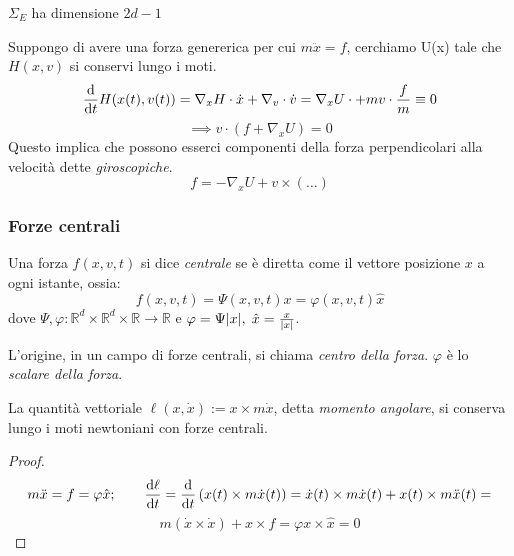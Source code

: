 \begin{remark}
    $\Sigma_E $ ha dimensione $2d-1$
\end{remark}

Suppongo di avere una forza genererica per cui $m\ddot{x}= f $, cerchiamo U(x) tale che $H(x,v)$ si conservi lungo i moti.
\begin{equation*}
    \dv{}{t}H(x(t),v(t))= \nabla_xH\cdot\dot{x}+\nabla_v\cdot\dot{v}= \nabla_xU\cdot + mv\cdot \frac{f}{m}\equiv0
\end{equation*}
\begin{equation}
    \implies v \cdot \left( f + \nabla_xU \right)=0
\end{equation}
Questo implica che possono esserci componenti della forza perpendicolari alla velocità dette \textit{giroscopiche}.
\begin{equation}
    f= -\nabla_xU + v\times (\dots)
\end{equation}



\subsubsection{Forze centrali}

\begin{definition}
    Una forza $f(x,v,t)$ si dice \textit{centrale} se è diretta come il vettore posizione $x$ a ogni istante, ossia:
    \begin{equation}
        f(x,v,t)= \Psi(x,v,t)x= \varphi(x,v,t)\hat{x}
    \end{equation}
    dove $\Psi,\varphi: \mathbb{R}^d\times \mathbb{R}^d \times \mathbb{R} \rightarrow \mathbb{R}$ e $\varphi=\Psi\abs{x}, \;\hat{x}=\frac{x}{\abs{x}}$.
\end{definition}

\begin{definition}
    L'origine, in un campo di forze centrali, si chiama \textit{centro della forza}. $\varphi$ è lo \textit{scalare della forza}.
\end{definition}

\begin{proposition}
    La quantità vettoriale $\ell(x,\dot{x}):= x\times m\dot{x}$, detta \textit{momento angolare}, si conserva lungo i moti newtoniani con forze centrali.
\end{proposition}
\begin{proof}
    \begin{equation*}
        m\ddot{x}= f= \varphi\hat{x};  \qquad \dv{\ell}{t}= \dv{t}\left( x(t)\times m\dot{x}(t)\right)= 
        \dot{x}(t)\times m\dot{x}(t)+ x(t)\times m\ddot{x}(t)=
    \end{equation*}
    \begin{equation}
        m(\dot{x}\times\dot{x})+x\times f= \varphi x \times \hat{x}=0
    \end{equation}
\end{proof}

